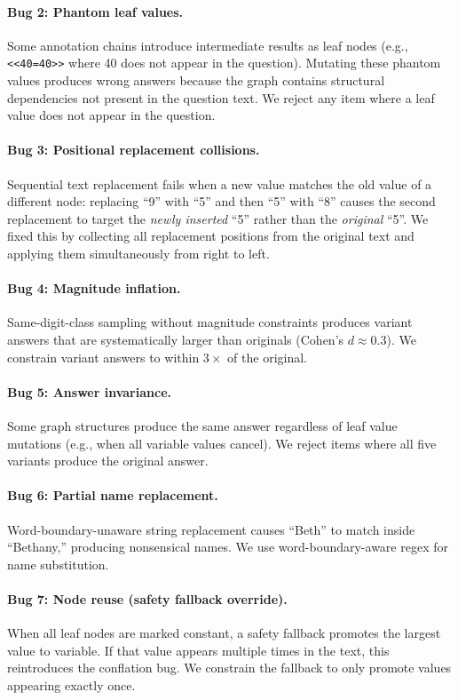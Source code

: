 \paragraph{Bug 2: Phantom leaf values.}
Some annotation chains introduce intermediate results as leaf nodes
(e.g., \texttt{<<40=40>>} where 40 does not appear in the question).
Mutating these phantom values produces wrong answers because the
graph contains structural dependencies not present in the question
text. We reject any item where a leaf value does not appear in the
question.

\paragraph{Bug 3: Positional replacement collisions.}
Sequential text replacement fails when a new value matches the old
value of a different node: replacing ``9'' with ``5'' and then ``5''
with ``8'' causes the second replacement to target the \emph{newly
inserted} ``5'' rather than the \emph{original} ``5''. We fixed this
by collecting all replacement positions from the original text and
applying them simultaneously from right to left.

\paragraph{Bug 4: Magnitude inflation.}
Same-digit-class sampling without magnitude constraints produces
variant answers that are systematically larger than originals
(Cohen's $d \approx 0.3$). We constrain variant answers to within
$3\times$ of the original.

\paragraph{Bug 5: Answer invariance.}
Some graph structures produce the same answer regardless of leaf
value mutations (e.g., when all variable values cancel). We reject
items where all five variants produce the original answer.

\paragraph{Bug 6: Partial name replacement.}
Word-boundary-unaware string replacement causes ``Beth'' to match
inside ``Bethany,'' producing nonsensical names. We use
word-boundary-aware regex for name substitution.

\paragraph{Bug 7: Node reuse (safety fallback override).}
When all leaf nodes are marked constant, a safety fallback promotes
the largest value to variable. If that value appears multiple times
in the text, this reintroduces the conflation bug. We constrain the
fallback to only promote values appearing exactly once.

